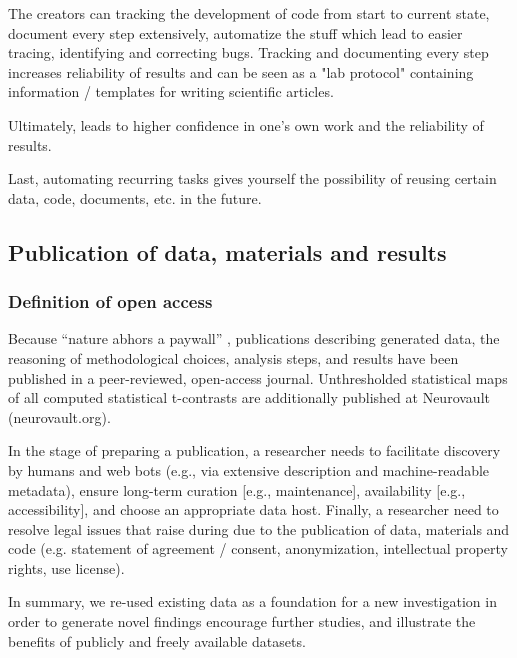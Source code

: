 %
The creators can tracking the development of code from start to current state,
document every step extensively, automatize the stuff which lead to easier
tracing, identifying and correcting bugs.
%
Tracking and documenting every step increases reliability of results and can be
seen as a "lab protocol" containing information / templates for writing
scientific articles.

%
Ultimately, leads to higher confidence in one's own work and the reliability of
results.

%
Last, automating recurring tasks gives yourself the possibility of reusing
certain data, code, documents, etc. in the future.



\subsection{Publication of data, materials and results}


\subsubsection{Definition of open access}

Because ``nature abhors a paywall'' \citep{dupre2020nature}, publications
describing generated data, the reasoning of methodological choices, analysis
steps, and results \citep{haeusler2021speechanno, haeusler2022processing} have
been published in a peer-reviewed, open-access journal.
%
Unthresholded statistical maps of all computed statistical t-contrasts are
additionally published at Neurovault (neurovault.org).


In the stage of preparing a publication, a researcher needs to facilitate
discovery by humans and web bots (e.g., via extensive description and
machine-readable metadata), ensure long-term curation [e.g., maintenance],
availability [e.g., accessibility], and choose an appropriate data host.
Finally, a researcher need to resolve legal issues that raise during due to the
publication of data, materials and code (e.g. statement of agreement / consent,
anonymization, intellectual property rights, use license).

In summary, we re-used existing data as a foundation for a new investigation in
order to generate novel findings encourage further studies, and illustrate the
benefits of publicly and freely available datasets.



